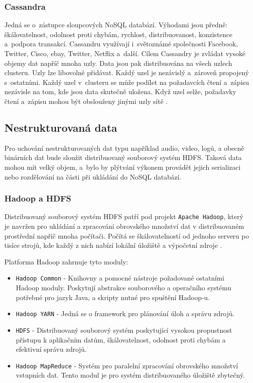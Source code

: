 \subsubsection{Cassandra}
Jedná se o~zástupce sloupcových NoSQL databází. Výhodami jsou předně: škálovatelnost, odolnost proti chybám, rychlost, distribuovanost, konzistence a~podpora transakcí. Cassandru využívají i~světoznámé společnosti Facebook, Twitter, Cisco, ebay, Twitter, Netflix a~další. Cílem Cassandry je zvládat vysoké objemy dat napříč mnoha uzly. Data jsou pak distribuována na všech uzlech clusteru. Uzly lze libovolně přidávat. Každý uzel je nezávislý a~zároveň propojený s~ostatními. Každý uzel v~clusteru se může podílet na požadavcích čtení a~zápisu nezávisle na tom, kde jsou data skutečně uložena. Když uzel selže, požadavky čtení a~zápisu mohou být obslouženy jinými uzly sítě \cite{cassandraTutorialsPoint}.

\subsection{Nestrukturovaná data}
Pro uchování nestrukturovaných dat typu například audio, video, logů, a obecně binárních dat bude sloužit distribuovaný souborový systém HDFS. Taková data mohou mít velký objem, a~bylo by plýtvání výkonem provádět jejich serializaci nebo rozdělování na části při ukládání do NoSQL databází.

\subsubsection{Hadoop a HDFS}
Distribuovaný souborový systém HDFS patří pod projekt \texttt{Apache Hadoop}, který je navržen pro ukládání a zpracování obrovského množství dat v distribuovaném prostřední napříč mnoha počítači. Počítá se škálovatelností od jednoho serveru po tisíce strojů, kde každý z nich nabízí lokální úložiště a výpočetní zdroje \cite{hadoopTutorialsPoint}.

\vspace{0.5cm}
\noindent Platforma Hadoop zahrnuje tyto moduly:

\begin{itemize}
    \item \texttt{Hadoop Common} - Knihovny a pomocné nástroje požadované ostatními Hadoop moduly. Poskytují abstrakce souborového a operačního systému potřebné pro jazyk Java, a skripty nutné pro spuštění Hadoop-u.
    
    \item \texttt{Hadoop YARN} - Jedná se o framework pro plánování úloh a správu zdrojů.
    
    \item \texttt{HDFS} - Distribuovaný souborový systém poskytující vysokou propustnost přístupu k aplikačním datům, škálovatelnost, odolnost proti chybám a efektivní správu zdrojů.
    
    \item \texttt{Hadoop MapReduce} - Systém pro paralelní zpracování obrovského množství vstupních dat. Tento modul je pro systém distribuovaného úložiště zbytečný.
\end{itemize}


